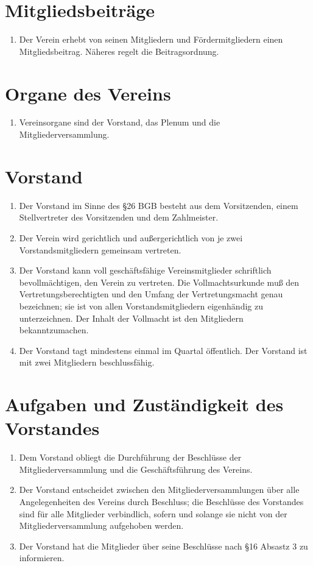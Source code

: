 \documentclass[ngerman]{scrartcl}
\begin{document}
\section{Mitgliedsbeiträge} \label{sec:mitgliedsbeitraege}
\begin{enumerate}
 \item Der Verein erhebt von seinen Mitgliedern und Fördermitgliedern
 einen Mitgliedsbeitrag. Näheres regelt die Beitragsordnung.
\end{enumerate}
\section{Organe des Vereins} \label{sec:organe_des_vereins}
\begin{enumerate}
 \item Vereinsorgane sind der Vorstand, das Plenum und die Mitgliederversammlung.
\end{enumerate}
\section{Vorstand} \label{sec:vostand}
\begin{enumerate}
 \item Der Vorstand im Sinne des §26 BGB besteht aus dem
 Vorsitzenden, einem Stellvertreter des Vorsitzenden und dem
 Zahlmeister.
 
 \item Der Verein wird gerichtlich und außergerichtlich von je
 zwei Vorstandsmitgliedern gemeinsam vertreten.
 
 \item Der Vorstand kann voll geschäftsfähige Vereinsmitglieder
 schriftlich bevollmächtigen, den Verein zu vertreten. Die
 Vollmachtsurkunde muß den Vertretungsberechtigten und den
 Umfang der Vertretungsmacht genau bezeichnen; sie ist von
 allen Vorstandsmitgliedern eigenhändig zu unterzeichnen. Der
 Inhalt der Vollmacht ist den Mitgliedern bekanntzumachen.
 
 \item Der Vorstand tagt mindestens einmal im Quartal öffentlich.
 Der Vorstand ist mit zwei Mitgliedern beschlussfähig.
\end{enumerate}
\section{Aufgaben und Zuständigkeit des Vorstandes}
\begin{enumerate}
 \item Dem Vorstand obliegt die Durchführung der Beschlüsse der
 Mitgliederversammlung und die Geschäftsführung des Vereins.
 
 \item Der Vorstand entscheidet zwischen den
 Mitgliederversammlungen über alle Angelegenheiten des Vereins
 durch Beschluss; die Beschlüsse des Vorstandes sind für alle
 Mitglieder verbindlich, sofern und solange sie nicht von der
 Mitgliederversammlung aufgehoben werden.
 
 \item Der Vorstand hat die Mitglieder über seine Beschlüsse nach 
 §16 Absastz 3 zu informieren.
\end{enumerate}
\end{document}
